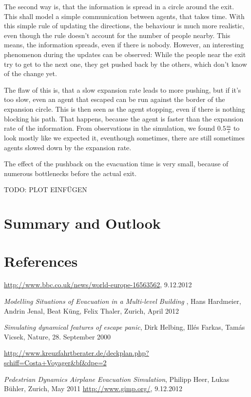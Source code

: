 \documentclass[11pt]{article}
\begin{document}
The second way is, that the information is spread in a circle around the exit.
This shall model a simple communication between agents, that takes time.
With this simple rule of updating the directions, the behaviour is much more realistic, even though the rule doesn't account for the number of people nearby. 
This means, the information spreads, even if there is nobody. 
However, an interesting phenomenon during the updates can be observed:
While the people near the exit try to get to the next one, they get pushed back by the others, which don't know of the change yet.

The flaw of this is, that a slow expansion rate leads to more pushing, but if it's too slow, even an agent that escaped can be run against the border of the expansion circle.
This is then seen as the agent stopping, even if there is nothing blocking his path. That happens, because the agent is faster than the expansion rate of the information. From observations in the simulation, we found \(0.5\frac{m}{s}\) to look mostly like we expected it, eventhough sometimes, there are still sometimes agents slowed down by the expansion rate.

The effect of the pushback on the evacuation time is very small, because of numerous bottlenecks before the actual exit.

TODO: PLOT EINFÜGEN


\section{Summary and Outlook}

\section{References}



\begingroup 
\renewcommand{\section}[2]{}%
\begin{thebibliography}{9}

		\url{http://www.bbc.co.uk/news/world-europe-16563562}, 9.12.2012

	\emph{Modelling Situations of Evacuation
in a Multi-level Building} , 
Hans Hardmeier, Andrin Jenal, Beat Küng, Felix Thaler, Zurich, April 2012

		\emph{Simulating dynamical features of escape panic},
		Dirk Helbing, Ill\'es Farkas, Tam\'as Vicsek, Nature, 28. September 2000

		\url{http://www.kreuzfahrtberater.de/deckplan.php?schiff=Costa+Voyager&bf&dpe=2}

		\emph{Pedestrian Dynamics Airplane Evacuation Simulation},
		Philipp Heer, Lukas Bühler, Zurich, May 2011
		\url{http://www.gimp.org/}, 9.12.2012
\end{thebibliography}
\endgroup
\end{document}
